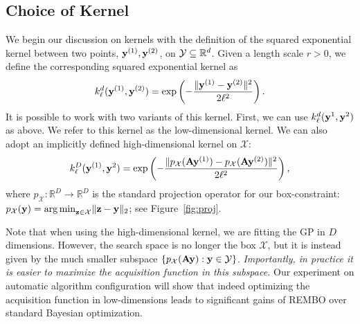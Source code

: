 \documentclass{article}
\begin{document}
\subsection{Choice of Kernel}\label{sec:choice_of_kernel}

We begin our discussion on kernels with the definition of the squared exponential kernel between two points, $\mathbf{y}^{(1)}, \mathbf{y}^{(2)}$, on ${\cal Y} \subseteq \mathbb{R}^d$.
Given a length scale $r > 0$, we define the corresponding {squared exponential} kernel as 
\[ k_{\ell}^d(\mathbf{y}^{(1)},\mathbf{y}^{(2)}) = \exp\left({-\frac{\|\mathbf{y}^{(1)}-\mathbf{y}^{(2)}\|^2}{2\ell^2}}\right). \]
It is possible to work with two variants of this kernel. 
First, we can use $k_{\ell}^d(\mathbf{y}^1, \mathbf{y}^2)$ as above. We refer to this kernel as the low-dimensional kernel. We can also adopt an implicitly defined high-dimensional kernel on 
$\mathcal{X}$:
$$k_{\ell}^D(\mathbf{y}^{(1)}, \mathbf{y}^2) = \exp\left( -\frac{\| p_{\mathcal{X}}(\mathbf{A}\mathbf{y}^{(1)}) - p_{\mathcal{X}}(\mathbf{A}\mathbf{y}^{(2)}) \|^2}{2\ell^2} \right),$$
where $p_{\mathcal{X}}:\mathbb{R}^D \rightarrow \mathbb{R}^D$ is the standard projection operator for our box-constraint: $p_{\mathcal{X}}(\mathbf{y}) = {\arg \min}_{\mathbf{z}\in \mathcal{X}} \|\mathbf{z}-\mathbf{y}\|_2$; see Figure~\ref{fig:proj}. 


Note that when using the high-dimensional kernel, we are fitting the GP in $D$ dimensions. However, the search space is no longer the box $\mathcal{X}$, but it is instead given by the much smaller subspace $\{p_{\mathcal{X}}(\mathbf{A}\mathbf{y}): \mathbf{y} \in {\cal Y} \}$. \emph{Importantly, in practice it is easier to maximize the acquisition function in this subspace.} Our experiment on automatic algorithm configuration will show that indeed optimizing the acquisition function in low-dimensions leads to significant gains of REMBO over standard Bayesian optimization.


% 
 
\end{document}
